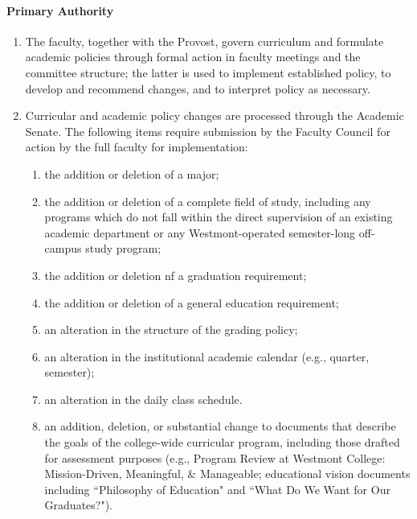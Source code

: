 \documentclass[letterpaper, 11pt]{article}
\begin{document}
			\paragraph{Primary Authority}
				\begin{enumerate}[label=\alph*)]

					\item{ The faculty, together with the Provost, govern curriculum
						and formulate academic policies through formal action in
						faculty meetings and the committee structure; the latter is
						used to implement established policy, to develop and
						recommend changes, and to interpret policy as necessary.}
					\item{ Curricular and academic policy changes are processed
						through the Academic Senate. The following items require
						submission by the Faculty Council for action by the full
						faculty for implementation:
						\begin{enumerate}[label=\arabic*)]
							\item{ the addition or deletion of a major;}

							\item{ the addition or deletion of a complete field of study, including any programs which
								do not fall within the direct supervision of an existing academic department or any
								Westmont-operated semester-long off-campus study program;}

							\item{ the addition or deletion nf a graduation requirement;}

							\item{ the addition or deletion of a general education requirement;}

							\item{ an alteration in the structure of the grading policy;}

							\item{ an alteration in the institutional academic calendar (e.g., quarter, semester);}

							\item{ an alteration in the daily class schedule.}

							\item{ an addition, deletion, or substantial change to documents that describe the goals of
								the college-wide curricular program, including those drafted for assessment purposes
								(e.g., Program Review at Westmont College: Mission-Driven, Meaningful, \& Manageable;
								educational vision documents including ``Philosophy of Education" and ``What Do We Want
								for Our Graduates?").}

						\end{enumerate}
					}
				\end{enumerate}
\end{document}
